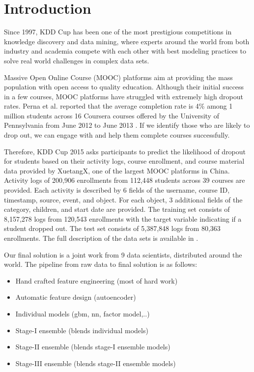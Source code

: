 \section{Introduction}
Since 1997, KDD Cup has been one of the most prestigious competitions in knowledge discovery and data mining, where experts around the world from both industry and academia compete with each other with best modeling practices to solve real world challenges in complex data sets.

Massive Open Online Course (MOOC) platforms aim at providing the mass population with open access to quality education.  Although their initial success in a few courses, MOOC platforms have struggled with extremely high dropout rates. Perna et al. reported that the average completion rate is 4\% among 1 million students across 16 Coursera courses offered by the University of Pennsylvania from June 2012 to June 2013 \cite{perna2013life}.  If we identify those who are likely to drop out, we can engage with and help them complete courses successfully.

Therefore, KDD Cup 2015 asks participants to predict the likelihood of dropout for students based on their activity logs, course enrollment, and course material data provided by XuetangX, one of the largest MOOC platforms in China.
Activity logs of 200,906 enrollments from 112,448 students across 39 courses are provided.
Each activity is described by 6 fields of the username, course ID, timestamp, source, event, and object. 
For each object, 3 additional fields of the category, children, and start date are provided.
The training set consists of 8,157,278 logs from 120,543 enrollments with the target variable indicating if a student dropped out.  
The test set consists of 5,387,848 logs from 80,363 enrollments.
The full description of the data sets is available in \cite{kddcup2015_data}.

Our final solution is a joint work from 9 data scientists, distributed around the world.
The pipeline from raw data to final solution is as follows:
\begin{itemize}
  \setlength\itemsep{0em}
  \item Hand crafted feature engineering (most of hard work)
  \item Automatic feature design (autoencoder)
  \item Individual models (gbm, nn, factor model,..)
  \item Stage-I ensemble (blends individual models)
  \item Stage-II ensemble (blends stage-I ensemble models)
  \item Stage-III ensemble (blends stage-II ensemble models)
\end{itemize}

